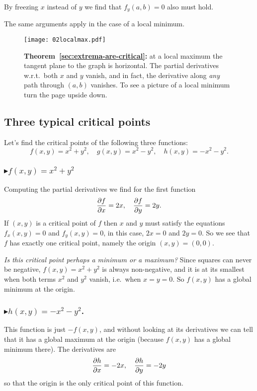 By freezing $x$ instead of $y$ we find that $f_y(a,b)=0$ also must hold.

The same arguments apply in the case of a local minimum.
\begin{figure}[htb]
  \centering

  \texttt{[image: 02localmax.pdf]}
  \caption{\textbf{Theorem~\ref{sec:extrema-are-critical}: } at a local maximum the tangent plane to the graph is horizontal.  The partial derivatives w.r.t.\ both $x$ and $y$ vanish, and in fact, the derivative along \emph{any} path through $(a,b)$ vanishes.  To see a picture of a local minimum turn the page upside down.}
  \label{fig:max-are-critical-picture-proof}
\end{figure}

\subsection{Three typical critical points}

\label{sec:criticalpoint-examples} 
Let's find the critical points of the following three functions:
\[
f(x, y) = x^2+y^2, \quad g(x, y) = x^2-y^2, \quad h(x, y) = -x^2-y^2.
\]
\subsubsection*{$\blacktriangleright f(x, y) = x^2+y^2$}
Computing the partial derivatives we find for the first function
\[
\frac{\partial f}{\partial x} = 2x, \quad \frac{\partial f}{\partial y} = 2y.
\]
If $(x,y)$ is a critical point of $f$ then $x$ and $y$ must satisfy the
equations $f_x(x, y) = 0$ and $f_y(x, y) = 0$, in this case, $2x=0$ and $2y=0$.
So we see that $f$ has exactly one critical point, namely the origin $(x,y) =
(0,0)$.

\textit{Is this critical point perhaps a minimum or a maximum?}  Since squares
can never be negative, $f(x,y) = x^2+y^2$ is always non-negative, and it is at
its smallest when both terms $x^2$ and $y^2$ vanish, i.e.~when $x=y=0$.  So
$f(x, y)$ has a global minimum at the origin.

\subsubsection*{$\blacktriangleright h(x, y) = -x^2-y^2$. } 
This function is just $-f(x,y)$, and without looking at its derivatives we can
tell that it has a global maximum at the origin (because $f(x,y)$ has a global
minimum there).  The derivatives are
\[
\frac{\partial h}{\partial x} = -2x, \quad \frac{\partial h}{\partial y} = -2y
\]
so that the origin is the only critical point of this function.

